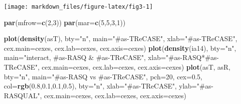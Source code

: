 \documentclass[]{article}
\newenvironment{Shaded}{\begin{snugshade}}{\end{snugshade}}
\newcommand{\KeywordTok}[1]{\textcolor[rgb]{0.13,0.29,0.53}{\textbf{#1}}}
\newcommand{\DataTypeTok}[1]{\textcolor[rgb]{0.13,0.29,0.53}{#1}}
\newcommand{\DecValTok}[1]{\textcolor[rgb]{0.00,0.00,0.81}{#1}}
\newcommand{\FloatTok}[1]{\textcolor[rgb]{0.00,0.00,0.81}{#1}}
\newcommand{\StringTok}[1]{\textcolor[rgb]{0.31,0.60,0.02}{#1}}
\newcommand{\NormalTok}[1]{#1}
\begin{document}
\begin{center}\texttt{[image: markdown\_files/figure-latex/fig3-1]} \end{center}

\begin{Shaded}
\begin{Highlighting}[]
\KeywordTok{par}\NormalTok{(}\DataTypeTok{mfrow=}\KeywordTok{c}\NormalTok{(}\DecValTok{2}\NormalTok{,}\DecValTok{3}\NormalTok{))}
\KeywordTok{par}\NormalTok{(}\DataTypeTok{mar=}\KeywordTok{c}\NormalTok{(}\DecValTok{5}\NormalTok{,}\DecValTok{5}\NormalTok{,}\DecValTok{3}\NormalTok{,}\DecValTok{1}\NormalTok{))}

\KeywordTok{plot}\NormalTok{(}\KeywordTok{density}\NormalTok{(asT), }\DataTypeTok{bty=}\StringTok{"n"}\NormalTok{, }\DataTypeTok{main=}\StringTok{"#as-TReCASE"}\NormalTok{, }
     \DataTypeTok{xlab=}\StringTok{"#as-TReCASE"}\NormalTok{, }\DataTypeTok{cex.main=}\NormalTok{cexes, }\DataTypeTok{cex.lab=}\NormalTok{cexes, }\DataTypeTok{cex.axis=}\NormalTok{cexes)}
\KeywordTok{plot}\NormalTok{(}\KeywordTok{density}\NormalTok{(ia14), }\DataTypeTok{bty=}\StringTok{"n"}\NormalTok{, }\DataTypeTok{main=}\StringTok{"interact, #as-RASQ & #as-TReCASE"}\NormalTok{, }
     \DataTypeTok{xlab=}\StringTok{"#as-RASQ*#as-TReCASE"}\NormalTok{, }\DataTypeTok{cex.main=}\NormalTok{cexes, }\DataTypeTok{cex.lab=}\NormalTok{cexes, }\DataTypeTok{cex.axis=}\NormalTok{cexes)}
\KeywordTok{plot}\NormalTok{(asT, asR, }\DataTypeTok{bty=}\StringTok{"n"}\NormalTok{, }\DataTypeTok{main=}\StringTok{"#as-RASQ vs #as-TReCASE"}\NormalTok{, }\DataTypeTok{pch=}\DecValTok{20}\NormalTok{, }\DataTypeTok{cex=}\FloatTok{0.5}\NormalTok{, }\DataTypeTok{col=}\KeywordTok{rgb}\NormalTok{(}\FloatTok{0.8}\NormalTok{,}\FloatTok{0.1}\NormalTok{,}\FloatTok{0.1}\NormalTok{,}\FloatTok{0.5}\NormalTok{), }\DataTypeTok{bty=}\StringTok{"n"}\NormalTok{, }
              \DataTypeTok{xlab=}\StringTok{"#as-TReCASE"}\NormalTok{, }\DataTypeTok{ylab=}\StringTok{"#as-RASQUAL"}\NormalTok{, }\DataTypeTok{cex.main=}\NormalTok{cexes, }\DataTypeTok{cex.lab=}\NormalTok{cexes, }\DataTypeTok{cex.axis=}\NormalTok{cexes)}


\end{Highlighting}
\end{Shaded}
\end{document}
